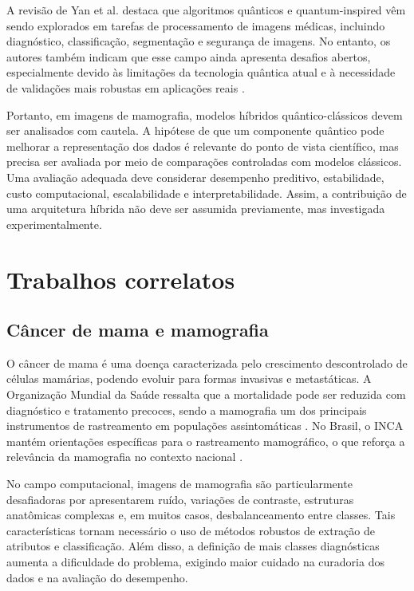 \documentclass[
    12pt,
    openright,
    oneside,
    a4paper,
    english,
    brazil
]{abntex2}
\begin{document}
A revisão de Yan et al. destaca que algoritmos quânticos e quantum-inspired vêm sendo explorados em tarefas de processamento de imagens médicas, incluindo diagnóstico, classificação, segmentação e segurança de imagens. No entanto, os autores também indicam que esse campo ainda apresenta desafios abertos, especialmente devido às limitações da tecnologia quântica atual e à necessidade de validações mais robustas em aplicações reais \cite{yan2024quantumMedicalImageReview}.

Portanto, em imagens de mamografia, modelos híbridos quântico-clássicos devem ser analisados com cautela. A hipótese de que um componente quântico pode melhorar a representação dos dados é relevante do ponto de vista científico, mas precisa ser avaliada por meio de comparações controladas com modelos clássicos. Uma avaliação adequada deve considerar desempenho preditivo, estabilidade, custo computacional, escalabilidade e interpretabilidade. Assim, a contribuição de uma arquitetura híbrida não deve ser assumida previamente, mas investigada experimentalmente.

\section{Trabalhos correlatos}

\subsection{Câncer de mama e mamografia}

O câncer de mama é uma doença caracterizada pelo crescimento descontrolado de células mamárias, podendo evoluir para formas invasivas e metastáticas. A Organização Mundial da Saúde ressalta que a mortalidade pode ser reduzida com diagnóstico e tratamento precoces, sendo a mamografia um dos principais instrumentos de rastreamento em populações assintomáticas \cite{WHO2025BreastCancer}. No Brasil, o INCA mantém orientações específicas para o rastreamento mamográfico, o que reforça a relevância da mamografia no contexto nacional \cite{INCA2025Rastreamento}.

No campo computacional, imagens de mamografia são particularmente desafiadoras por apresentarem ruído, variações de contraste, estruturas anatômicas complexas e, em muitos casos, desbalanceamento entre classes. Tais características tornam necessário o uso de métodos robustos de extração de atributos e classificação. Além disso, a definição de mais classes diagnósticas aumenta a dificuldade do problema, exigindo maior cuidado na curadoria dos dados e na avaliação do desempenho.
\end{document}
